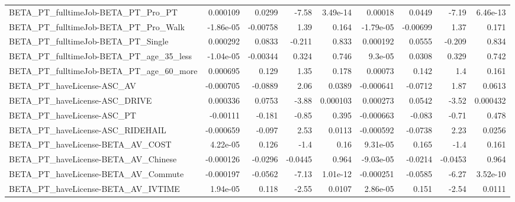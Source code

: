 \begin{tabular}{lrrrrrrrr}
BETA\_PT\_fulltimeJob-BETA\_PT\_Pro\_PT                 &    0.000109 &       0.0299 &     -7.58 & 3.49e-14 &    0.00018 &      0.0449 &        -7.19 &      6.46e-13 \\
BETA\_PT\_fulltimeJob-BETA\_PT\_Pro\_Walk               &   -1.86e-05 &     -0.00758 &      1.39 &    0.164 &  -1.79e-05 &    -0.00699 &         1.37 &         0.171 \\
BETA\_PT\_fulltimeJob-BETA\_PT\_Single                 &    0.000292 &       0.0833 &    -0.211 &    0.833 &   0.000192 &      0.0555 &       -0.209 &         0.834 \\
BETA\_PT\_fulltimeJob-BETA\_PT\_age\_35\_less            &   -1.04e-05 &     -0.00344 &     0.324 &    0.746 &    9.3e-05 &      0.0308 &        0.329 &         0.742 \\
BETA\_PT\_fulltimeJob-BETA\_PT\_age\_60\_more            &    0.000695 &        0.129 &      1.35 &    0.178 &    0.00073 &       0.142 &          1.4 &         0.161 \\
BETA\_PT\_haveLicense-ASC\_AV                         &   -0.000705 &      -0.0889 &      2.06 &   0.0389 &  -0.000641 &     -0.0712 &         1.87 &        0.0613 \\
BETA\_PT\_haveLicense-ASC\_DRIVE                      &    0.000336 &       0.0753 &     -3.88 & 0.000103 &   0.000273 &      0.0542 &        -3.52 &      0.000432 \\
BETA\_PT\_haveLicense-ASC\_PT                         &    -0.00111 &       -0.181 &     -0.85 &    0.395 &  -0.000663 &      -0.083 &        -0.71 &         0.478 \\
BETA\_PT\_haveLicense-ASC\_RIDEHAIL                   &   -0.000659 &       -0.097 &      2.53 &   0.0113 &  -0.000592 &     -0.0738 &         2.23 &        0.0256 \\
BETA\_PT\_haveLicense-BETA\_AV\_COST                   &    4.22e-05 &        0.126 &      -1.4 &     0.16 &   9.31e-05 &       0.165 &         -1.4 &         0.161 \\
BETA\_PT\_haveLicense-BETA\_AV\_Chinese                &   -0.000126 &      -0.0296 &   -0.0445 &    0.964 &  -9.03e-05 &     -0.0214 &      -0.0453 &         0.964 \\
BETA\_PT\_haveLicense-BETA\_AV\_Commute                &   -0.000197 &      -0.0562 &     -7.13 & 1.01e-12 &  -0.000251 &     -0.0585 &        -6.27 &      3.52e-10 \\
BETA\_PT\_haveLicense-BETA\_AV\_IVTIME                 &    1.94e-05 &        0.118 &     -2.55 &   0.0107 &   2.86e-05 &       0.151 &        -2.54 &        0.0111 \\

\end{tabular}
